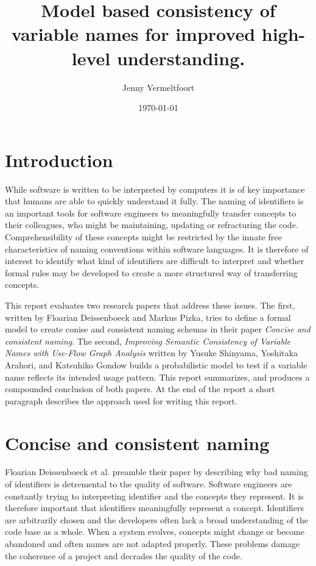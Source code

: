 \documentclass[a4paper,12pt]{article}
\begin{document}
\title{Model based consistency of variable names for improved high-level understanding.}
\author{Jenny Vermeltfoort}
\date{\today}
\maketitle

\section{Introduction}
While software is written to be interpreted by computers it is of key importance that humans are able to quickly understand it fully. The naming of identifiers is an important tools for software engineers to meaningfully transfer concepts to their colleagues, who might be maintaining, updating or refracturing the code. Comprehensibility of these concepts might be restricted by the innate free characteristics of naming conventions within software languages. It is therefore of interest to identify what kind of identifiers are difficult to interpret and whether formal rules may be developed to create a more structured way of transferring concepts.

This report evaluates two research papers that address these issues. The first, written by Floarian Deissenboeck and Markus Pizka, tries to define a formal model to create conise and consistent naming schemas in their paper \textit{Concise and consistent naming}. The second, \textit{Improving Semantic Consistency of Variable Names with Use-Flow Graph Analysis} written by Yusuke Shinyama, Yoshitaka Arahori, and Katsuhiko Gondow builds a probabilistic model to test if a variable name reflects its intended usage pattern. This report summarizes, and produces a compounded conclusion of both papers. At the end of the report a short paragraph describes the approach used for writing this report.

\newpage
\section{Concise and consistent naming}
Floarian Deissenboeck et al. preamble their paper by describing why bad naming of identifiers is detremental to the quality of software. Software engineers are constantly trying to interpreting identifier and the concepts they represent. It is therefore important that identifiers meaningfully represent a concept. Identifiers are arbitrarily chosen and the developers often lack a broad understanding of the code base as a whole. When a system evolves, concepts might change or become abandoned and often names are not adapted properly. These problems damage the coherence of a project and decrades the quality of the code.
\end{document}
